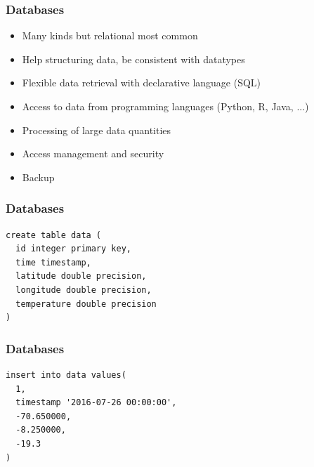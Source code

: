 \documentclass{beamer}
\begin{document}
{
	\begin{frame}[plain]
	  \frametitle{Databases}
	  
	  \begin{itemize}
	  \item Many kinds but relational most common
	  \item Help structuring data, be consistent with datatypes
	  \item Flexible data retrieval with declarative language (SQL)
	  \item Access to data from programming languages (Python, R, Java, ...)
	  \item Processing of large data quantities
	  \item Access management and security
	  \item Backup
	  \end{itemize}
	\end{frame}
}

\begin{frame}[fragile]
  \frametitle{Databases}
  
  \small
  \begin{verbatim}
create table data (
  id integer primary key, 
  time timestamp, 
  latitude double precision, 
  longitude double precision, 
  temperature double precision
)
  \end{verbatim}
\end{frame}

\begin{frame}[fragile]
  \frametitle{Databases}
  
  \small
  \begin{verbatim}
insert into data values(
  1, 
  timestamp '2016-07-26 00:00:00', 
  -70.650000, 
  -8.250000, 
  -19.3
)
  \end{verbatim}
\end{frame}
\end{document}
